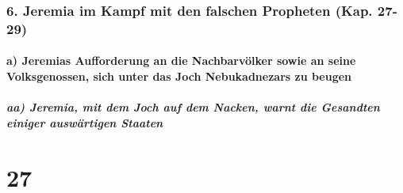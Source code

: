 \hypertarget{jeremia-im-kampf-mit-den-falschen-propheten-kap.-27-29}{%
\subsubsection{6. Jeremia im Kampf mit den falschen Propheten (Kap.
27-29)}\label{jeremia-im-kampf-mit-den-falschen-propheten-kap.-27-29}}

\hypertarget{a-jeremias-aufforderung-an-die-nachbarvuxf6lker-sowie-an-seine-volksgenossen-sich-unter-das-joch-nebukadnezars-zu-beugen}{%
\paragraph{a) Jeremias Aufforderung an die Nachbarvölker sowie an seine
Volksgenossen, sich unter das Joch Nebukadnezars zu
beugen}\label{a-jeremias-aufforderung-an-die-nachbarvuxf6lker-sowie-an-seine-volksgenossen-sich-unter-das-joch-nebukadnezars-zu-beugen}}

\hypertarget{aa-jeremia-mit-dem-joch-auf-dem-nacken-warnt-die-gesandten-einiger-auswuxe4rtigen-staaten}{%
\subparagraph{aa) Jeremia, mit dem Joch auf dem Nacken, warnt die
Gesandten einiger auswärtigen
Staaten}\label{aa-jeremia-mit-dem-joch-auf-dem-nacken-warnt-die-gesandten-einiger-auswuxe4rtigen-staaten}}

\hypertarget{section-26}{%
\section{27}\label{section-26}}

